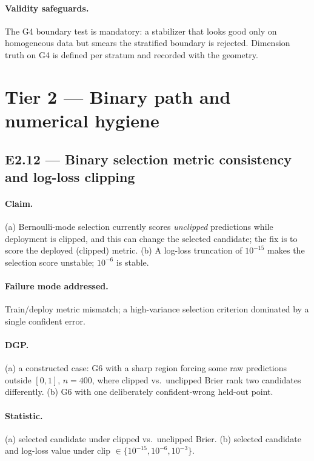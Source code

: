 \documentclass[11pt]{article}
\begin{document}
\paragraph{Validity safeguards.} The G4 boundary test is mandatory: a stabilizer that looks
good only on homogeneous data but smears the stratified boundary is rejected. Dimension truth
on G4 is defined per stratum and recorded with the geometry.

\section{Tier 2 — Binary path and numerical hygiene}

\subsection{E2.12 — Binary selection metric consistency and log-loss clipping}

\paragraph{Claim.} (a) Bernoulli-mode selection currently scores \emph{unclipped} predictions
while deployment is clipped, and this can change the selected candidate; the fix is to score the
deployed (clipped) metric. (b) A log-loss truncation of $10^{-15}$ makes the selection score
unstable; $10^{-6}$ is stable.

\paragraph{Failure mode addressed.} Train/deploy metric mismatch; a high-variance selection
criterion dominated by a single confident error.

\paragraph{DGP.} (a) a constructed case: G6 with a sharp region forcing some raw predictions
outside $[0,1]$, $n=400$, where clipped vs.\ unclipped Brier rank two candidates differently.
(b) G6 with one deliberately confident-wrong held-out point.

\paragraph{Statistic.} (a) selected candidate under clipped vs.\ unclipped Brier. (b) selected
candidate and log-loss value under clip $\in\{10^{-15},10^{-6},10^{-3}\}$.
\end{document}
